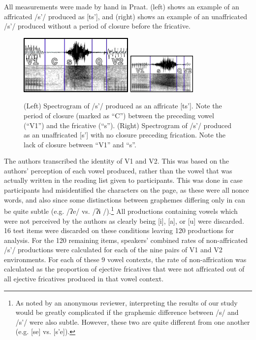 \documentclass[output=paper
,newtxmath
,modfonts
,nonflat]{langsci/langscibook}
\begin{document}
All measurements were made by hand in Praat.  (left) shows an example of an affricated /s’/ produced as [ts’], and  (right) shows an example of an unaffricated /s’/ produced without a period of closure before the fricative.        
 

\begin{figure}
\includegraphics[width=0.5\textwidth]{figures/fig-moeng-1a}
\includegraphics[width=0.3\textwidth]{figures/fig-moeng-1b}
\caption{(Left) Spectrogram of /s’/ produced as an affricate [ts’]. Note the period of closure (marked as “C”) between the preceding vowel (“V1”) and the fricative (“s”). (Right) Spectrogram of /s’/ produced as an unaffricated [s’] with no closure preceding frication. Note the lack of closure between “V1” and “s”.}
\label{fig:moeng:2}
\end{figure}

The authors transcribed the identity of V1 and V2. This was based on the authors’ perception of each vowel produced, rather than the vowel that was actually written in the reading list given to participants. This was done in case participants had misidentified the characters on the page, as these were all nonce words, and also since some distinctions between graphemes differing only in  can be quite subtle (e.g.  /ʔe/ vs.  /ʔɨ /).\footnote{As noted by an anonymous reviewer, interpreting the results of our study would be greatly complicated if the graphemic difference between /s/ and /s’/ were also subtle. However, these two are quite different from one another (e.g.  [se] vs.  [s’e]).} All productions containing vowels which were not perceived by the authors as clearly being [i], [a], or [u] were discarded. 16 test items were discarded on these conditions leaving 120 productions for analysis. For the 120 remaining items, speakers’ combined rates of non-affricated /s’/ productions were calculated for each of the nine pairs of V1 and V2 environments. For each of these 9 vowel contexts, the rate of non-affrication was calculated as the proportion of ejective fricatives that were not affricated out of all ejective fricatives produced in that vowel context.
\end{document}
